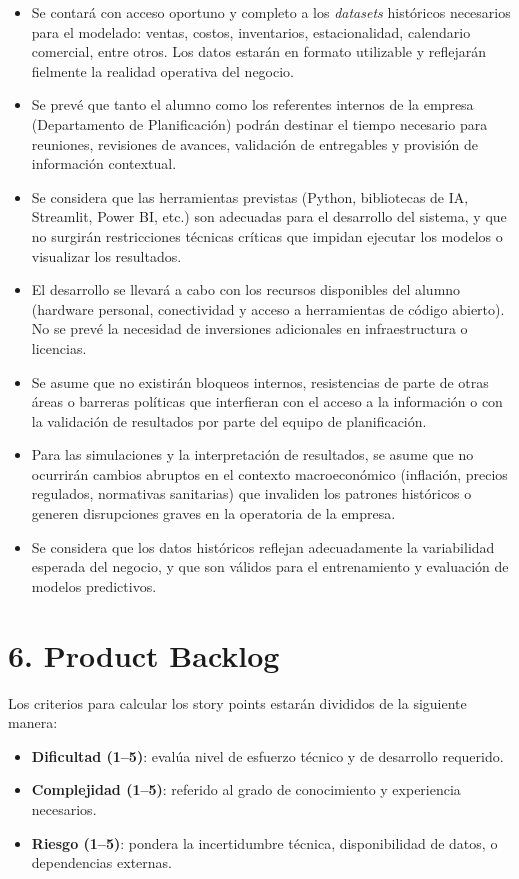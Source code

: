 \documentclass[
11pt, %
]{charter}
\begin{document}
\begin{itemize}
	\item Se contará con acceso oportuno y completo a los \textit{datasets} históricos necesarios para el modelado: ventas, costos, inventarios, estacionalidad, calendario comercial, entre otros. Los datos estarán en formato utilizable y reflejarán fielmente la realidad operativa del negocio.
	\item Se prevé que tanto el alumno como los referentes internos de la empresa (Departamento de Planificación) podrán destinar el tiempo necesario para reuniones, revisiones de avances, validación de entregables y provisión de información contextual.
	\item Se considera que las herramientas previstas (Python, bibliotecas de IA, Streamlit, Power BI, etc.) son adecuadas para el desarrollo del sistema, y que no surgirán restricciones técnicas críticas que impidan ejecutar los modelos o visualizar los resultados.
	\item El desarrollo se llevará a cabo con los recursos disponibles del alumno (hardware personal, conectividad y acceso a herramientas de código abierto). No se prevé la necesidad de inversiones adicionales en infraestructura o licencias.
	
	\item Se asume que no existirán bloqueos internos, resistencias de parte de otras áreas o barreras políticas que interfieran con el acceso a la información o con la validación de resultados por parte del equipo de planificación.
	\item Para las simulaciones y la interpretación de resultados, se asume que no ocurrirán cambios abruptos en el contexto macroeconómico (inflación, precios regulados, normativas sanitarias) que invaliden los patrones históricos o generen disrupciones graves en la operatoria de la empresa.
	\item Se considera que los datos históricos reflejan adecuadamente la variabilidad esperada del negocio, y que son válidos para el entrenamiento y evaluación de modelos predictivos.
\end{itemize}
\newpage

\section{6. Product Backlog}
\label{sec:backlog}

Los criterios para calcular los story points estarán divididos de la siguiente manera:
\begin{itemize}
	\item \textbf{Dificultad (1–5)}: evalúa nivel de esfuerzo técnico y de desarrollo requerido.
	\item \textbf{Complejidad (1–5)}: referido al grado de conocimiento y experiencia necesarios.
	\item \textbf{Riesgo (1–5)}: pondera la incertidumbre técnica, disponibilidad de datos, o dependencias externas.
\end{itemize}
\end{document}
